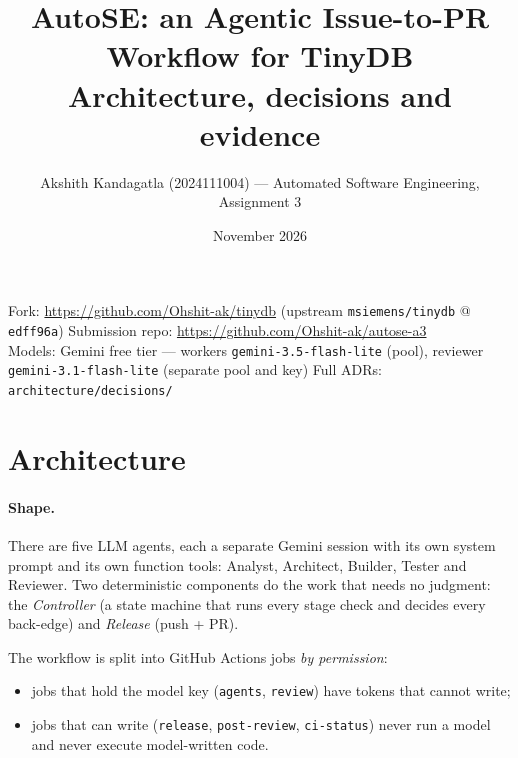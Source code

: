 \documentclass[10pt,a4paper]{article}
\title{AutoSE: an Agentic Issue-to-PR Workflow for TinyDB\\
\large Architecture, decisions and evidence}
\author{Akshith Kandagatla (2024111004) --- Automated Software Engineering, Assignment 3}
\date{November 2026}
\newcommand{\code}[1]{\texttt{#1}}
\begin{document}
\maketitle
\vspace{-1.5em}
\begin{center}\small
Fork: \url{https://github.com/Ohshit-ak/tinydb} (upstream \code{msiemens/tinydb} @ \code{edff96a}) \quad
Submission repo: \url{https://github.com/Ohshit-ak/autose-a3}\\
Models: Gemini free tier --- workers \code{gemini-3.5-flash-lite} (pool), reviewer \code{gemini-3.1-flash-lite} (separate pool and key) \quad Full ADRs: \code{architecture/decisions/}
\end{center}

\section{Architecture}

\paragraph{Shape.} There are five LLM agents, each a separate Gemini session with its own system
prompt and its own function tools: Analyst, Architect, Builder, Tester and Reviewer. Two
deterministic components do the work that needs no judgment: the \emph{Controller} (a state machine
that runs every stage check and decides every back-edge) and \emph{Release} (push + PR).

The workflow is split into GitHub Actions jobs \emph{by permission}:
\begin{itemize}
\item jobs that hold the model key (\code{agents}, \code{review}) have tokens that cannot write;
\item jobs that can write (\code{release}, \code{post-review}, \code{ci-status}) never run a model and
  never execute model-written code.
\end{itemize}
\end{document}
